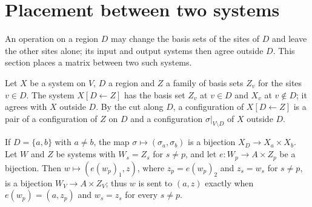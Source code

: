 \section{Placement between two systems}
\label{sec:sites_place_between}

An operation on a region $D$ may change the basis sets of the sites of $D$ and
leave the other sites alone; its input and output systems then agree outside
$D$. This section places a matrix between two such systems.

\begin{definition}
    \label{def:sites_update_on}
    \leanok
    Let $X$ be a system on $V$, $D$ a region and $Z$ a family of basis sets
    $Z_v$ for the sites $v\in D$. The system $X[D\leftarrow Z]$ has the basis set
    $Z_v$ at $v\in D$ and $X_v$ at $v\notin D$; it agrees with $X$ outside $D$.
    By the cut along $D$, a configuration of $X[D\leftarrow Z]$ is a pair of a
    configuration of $Z$ on $D$ and a configuration $\sigma|_{V\setminus D}$ of
    $X$ outside $D$.
\end{definition}

\begin{definition}
    \label{def:sites_pair_factor_config}
    \leanok
    If $D=\{a,b\}$ with $a\neq b$, the map $\sigma\mapsto(\sigma_a,\sigma_b)$ is a
    bijection $X_D\to X_a\times X_b$. Let $W$ and $Z$ be systems with $W_s=Z_s$
    for $s\neq p$, and let $e\colon W_p\to A\times Z_p$ be a bijection. Then
    $w\mapsto(e(w_p)_1,z)$, where $z_p=e(w_p)_2$ and $z_s=w_s$ for $s\neq p$, is a
    bijection $W_V\to A\times Z_V$; thus $w$ is sent to $(a,z)$ exactly when
    $e(w_p)=(a,z_p)$ and $w_s=z_s$ for every $s\neq p$.
\end{definition}


